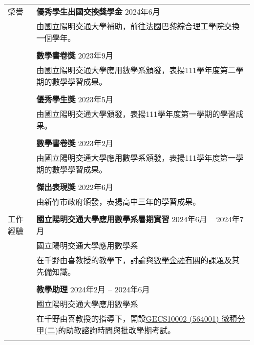 \documentclass[letterpaper, 11pt]{article}
\begin{document}
\begin{CJK*}{UTF8}{bsmi}
\begin{center}
\begin{longtable}{p{0.72in}p{5.97in}}
        
        {\textcolor{OliveGreen}{榮譽}} & \textbf{優秀學生出國交換獎學金} \hfill 2024年6月\\
        & 由國立陽明交通大學補助，前往法國巴黎綜合理工學院交換一個學年。 \\
        & \\
        & \textbf{數學書卷獎} \hfill 2023年9月\\
        & 由國立陽明交通大學應用數學系頒發，表揚111學年度第二學期的數學學習成果。\\
        & \\
        & \textbf{優秀學生獎} \hfill 2023年5月\\
        & 由國立陽明交通大學頒發，表揚111學年度第一學期的學習成果。\\
        & \\
        & \textbf{數學書卷獎} \hfill 2023年2月\\
        & 由國立陽明交通大學應用數學系頒發，表揚111學年度第一學期的數學學習成果。\\
        & \\
        & \textbf{傑出表現獎} \hfill 2022年6月\\
        & 由新竹市政府頒發，表揚高中三年的學習成果。\\
        & \\
        
        
        {\textcolor{OliveGreen}{工作經驗}} & \textbf{國立陽明交通大學應用數學系暑期實習} \hfill 2024年6月 -- 2024年7月 \\
        & 國立陽明交通大學應用數學系 \\
        & 在千野由喜教授的教學下，討論與\href{https://hackmd.io/@eiken-sc11/B1QcaW3B0}{數學金融有關}的課題及其先備知識。\\
        & \\
        
        & \textbf{教學助理}  \hfill 2024年2月 -- 2024年6月 \\
        & 國立陽明交通大學應用數學系\\
        & 在千野由喜教授的指導下，開設\href{https://timetable.nycu.edu.tw/?r=main/crsoutline&Acy=112&Sem=2&CrsNo=564001&lang=zh-tw}{GECS10002 (564001) 微積分甲(二)}的助教諮詢時間與批改學期考試。\\
        & \\
        

\end{longtable}
\end{center}
\end{CJK*}
\end{document}
